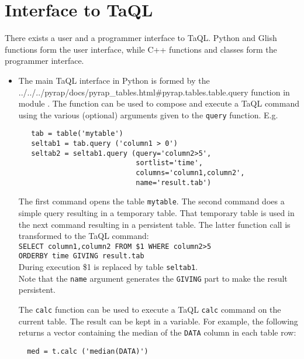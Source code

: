 \section{\label{TAQL:GLISHPC}Interface to TaQL}
There exists a user and a programmer interface to TaQL.
Python and Glish functions form the user interface, while C++ functions
and classes form the programmer interface.
\begin{itemize}
\item
  The main TaQL interface in Python is formed by the
  {../../../pyrap/docs/pyrap_tables.html\#pyrap.tables.table.query} function in module
  .
  The function can be used
  to compose and execute a TaQL command using the various (optional)
  arguments given to the \texttt{query} function. E.g.
\begin{verbatim}
   tab = table('mytable')
   seltab1 = tab.query ('column1 > 0')
   seltab2 = seltab1.query (query='column2>5',
                            sortlist='time',
                            columns='column1,column2',
                            name='result.tab')
\end{verbatim}
  The first command opens the table \texttt{mytable}.
  The second command does a simple query resulting in a temporary
  table. That temporary table is used in the next command resulting in
  a persistent table. The latter function call is transformed to
  the TaQL command:
  \\\texttt{SELECT column1,column2 FROM \$1 WHERE column2>5}
  \\\texttt{ORDERBY time GIVING result.tab}
  \\During execution \$1 is replaced by table \texttt{seltab1}.
  \\Note that the \texttt{name} argument
  generates the \texttt{GIVING} part to make the result persistent.

  The \texttt{calc} function can be used to execute a TaQL
  \texttt{calc} command on the current table. The result can be kept
  in a variable. For example, the following returns a vector containing
  the median of the \texttt{DATA} column in each table row:
\begin{verbatim}
  med = t.calc ('median(DATA)')
\end{verbatim}


\end{itemize}
